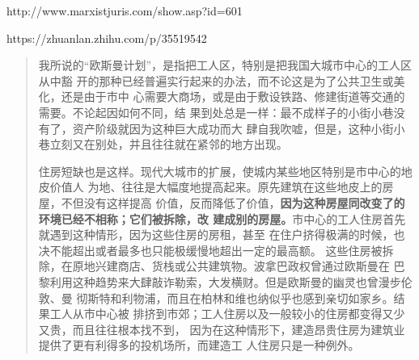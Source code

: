 http://www.marxistjuris.com/show.asp?id=601

https://zhuanlan.zhihu.com/p/35519542

\begin{quotation}
  我所说的“欧斯曼计划”，是指把工人区，特别是把我国大城市中心的工人区从中豁
  开的那种已经普遍实行起来的办法，而不论这是为了公共卫生或美化，还是由于市中
  心需要大商场，或是由于敷设铁路、修建街道等交通的需要。不论起因如何不同，结
  果到处总是一样：最不成样子的小街小巷没有了，资产阶级就因为这种巨大成功而大
  肆自我吹嘘，但是，这种小街小巷立刻又在别处，并且往往就在紧邻的地方出现。

  住房短缺也是这样。现代大城市的扩展，使城内某些地区特别是市中心的地皮价值人
  为地、往往是大幅度地提高起来。原先建筑在这些地皮上的房屋，不但没有这样提高
  价值，反而降低了价值，\textbf{因为这种房屋同改变了的环境已经不相称；它们被拆除，改
  建成别的房屋。}市中心的工人住房首先就遇到这种情形，因为这些住房的房租，甚至
  在住户挤得极满的时候，也决不能超出或者最多也只能极缓慢地超出一定的最高额。
  这些住房被拆除，在原地兴建商店、货栈或公共建筑物。波拿巴政权曾通过欧斯曼在
  巴黎利用这种趋势来大肆敲诈勒索，大发横财。但是欧斯曼的幽灵也曾漫步伦敦、曼
  彻斯特和利物浦，而且在柏林和维也纳似乎也感到亲切如家乡。结果工人从市中心被
  排挤到市郊；工人住房以及一般较小的住房都变得又少又贵，而且往往根本找不到，
  因为在这种情形下，建造昂贵住房为建筑业提供了更有利得多的投机场所，而建造工
  人住房只是一种例外。

\end{quotation}

